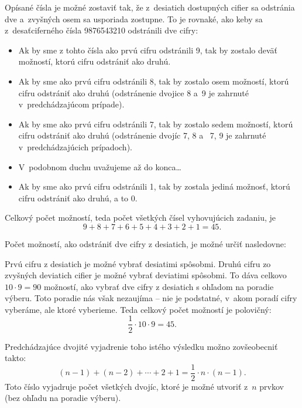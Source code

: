 {%
Opísané čísla je možné zostaviť tak, že z~desiatich dostupných cifier sa odstránia dve a~zvyšných osem sa usporiada zostupne.
To je rovnaké, ako keby sa z~desaťciferného čísla 9876543210 odstránili dve cifry:

\begin{itemize}
\item
Ak by sme z tohto čísla ako prvú cifru odstránili 9, tak by zostalo deväť možností, ktorú cifru odstrániť ako druhú.
\item
Ak by sme ako prvú cifru odstránili 8, tak by zostalo osem možností, ktorú cifru odstrániť ako druhú
(odstránenie dvojice 8 a~9 je zahrnuté v~predchádzajúcom prípade).
\item
Ak by sme ako prvú cifru odstránili 7, tak by zostalo sedem možností, ktorú cifru odstrániť ako druhú
(odstránenie dvojíc 7, 8 a ~7, 9 je zahrnuté v~predchádzajúcich prípadoch).
\item
V~podobnom duchu uvažujeme až do konca\dots
\item
Ak by sme ako prvú cifru odstránili 1, tak by zostala jediná možnosť, ktorú cifru odstrániť ako druhú, a to 0.
\end{itemize}
Celkový počet možností, teda počet všetkých čísel vyhovujúcich zadaniu, je
$$
9+8+7+6+5+4+3+2+1 =45.
$$

\ineriesenie
Počet možností, ako odstrániť dve cifry z desiatich, je možné určiť nasledovne:

Prvú cifru z desiatich je možné vybrať desiatimi spôsobmi.
Druhú cifru zo zvyšných deviatich cifier je možné vybrať deviatimi spôsobmi.
To dáva celkovo $10\cdot9=90$ možností, ako vybrať dve cifry z desiatich s ohľadom na poradie výberu.
Toto poradie nás však nezaujíma -- nie je podstatné, v~akom poradí cifry vyberáme, ale ktoré vyberieme.
Teda celkový počet možností je polovičný:
$$
\frac12\cdot10\cdot9 =45.
$$

\poznamka
Predchádzajúce dvojité vyjadrenie toho istého výsledku možno zovšeobecniť takto:
$$
(n-1)+(n-2)+\cdots+2+1 = \frac12\cdot n\cdot(n-1).
$$
Toto číslo vyjadruje počet všetkých dvojíc, ktoré je možné utvoriť z~$n$ prvkov
(bez ohľadu na poradie výberu).
}

